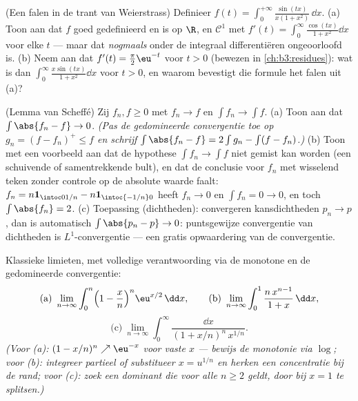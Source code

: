 \begin{exercise}[$\star\star\star$]\label{exo:b3:lebesgue:10}
(Een falen in de trant van Weierstrass) Definieer $f(t) =
\int_0^{+\infty}\frac{\sin(tx)}{x(1 + x^2)}\,\dd x$.
(a) Toon aan dat $f$ goed gedefinieerd en  is op $\R$, en
$\mathcal C^1$ met $f'(t) = \int_0^\infty\frac{\cos(tx)}{1 +
x^2}\dd x$ voor elke $t$ --- maar dat \emph{nogmaals} onder de
integraal differentiëren ongeoorloofd is.
(b) Neem aan dat $f'(t) = \frac\pi2\eu^{-t}$ voor $t > 0$ (bewezen
in \cref{ch:b3:residues}): wat is dan
$\int_0^\infty\frac{x\sin(tx)}{1+x^2}\dd x$ voor $t > 0$, en
waarom bevestigt die formule het falen uit (a)?
\end{exercise}

\begin{exercise}[$\star\star$]\label{exo:b3:lebesgue:11}
(Lemma van Scheffé) Zij $f_n, f \geq 0$  met $f_n \to
f$  en $\int f_n \to \int f$.
(a) Toon aan dat $\int\abs{f_n - f} \to 0$. \emph{(Pas de
gedomineerde convergentie toe op $g_n = (f - f_n)^+ \leq f$ en
schrijf $\int\abs{f_n - f} = 2\int g_n - \int(f - f_n)$.)}
(b) Toon met een voorbeeld aan dat de hypothese $\int f_n \to \int
f$ niet gemist kan worden (een schuivende of samentrekkende bult),
en dat de conclusie voor $f_n$ met wisselend teken zonder controle
op de absolute waarde faalt: $f_n = n\mathbf 1_{\intoc0{1/n}} -
n\mathbf 1_{\intoc{-1/n}0}$ heeft $f_n \to 0$  en
$\int f_n = 0 \to 0$, en toch $\int\abs{f_n} = 2$.
(c) Toepassing (dichtheden): convergeren kansdichtheden $p_n \to
p$ , dan is automatisch $\int\abs{p_n - p} \to 0$:
puntsgewijze convergentie van dichtheden is $L^1$-convergentie ---
een gratis opwaardering van de convergentie.
\end{exercise}

\begin{exercise}[$\star\star$]\label{exo:b3:lebesgue:12}
Klassieke limieten, met volledige verantwoording via de monotone
en de gedomineerde convergentie:
\[
\text{(a)}\ \lim_{n\to\infty}\int_0^n\Bigl(1 -
\frac xn\Bigr)^n\eu^{x/2}\,\dd x, \qquad
\text{(b)}\ \lim_{n\to\infty}\int_0^1\frac{n\,x^{n-1}}{1 +
x}\,\dd x,
\]
\[
\text{(c)}\ \lim_{n\to\infty}\int_0^\infty
\frac{\dd x}{(1 + x/n)^n\,x^{1/n}} .
\]
\emph{(Voor (a): $(1 - x/n)^n \nearrow \eu^{-x}$ voor vaste $x$ ---
bewijs de monotonie via $\log$; voor (b): integreer partieel of
substitueer $x = u^{1/n}$ en herken een concentratie bij de rand;
voor (c): zoek een  dominant die voor alle $n \geq 2$
geldt, door bij $x = 1$ te splitsen.)}
\end{exercise}


